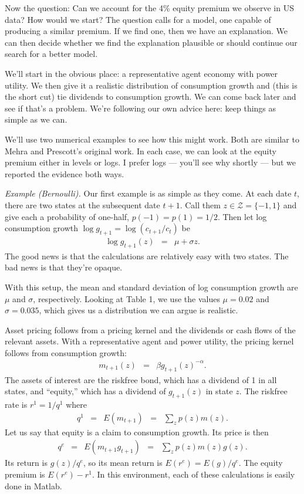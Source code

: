 \documentclass[11pt]{article}
\begin{document}
Now the question:  Can we account for the 4\% equity premium we observe in US data?
How would we start?
The question calls for a model, one capable of producing a similar premium.
If we find one, then we have an explanation.
We can then decide whether we find the explanation plausible
or should continue our search for a better model.

We'll start in the obvious place: a representative agent economy
with power utility.
We then give it a realistic distribution of consumption growth
and (this is the short cut) tie dividends to consumption growth.
We can come back later and see if that's a problem.
We're following our own advice here:
keep things as simple as we can.

We'll use two numerical examples to see how this might work.
Both are similar to Mehra and Prescott's original work.
In each case, we can look at the equity premium either in levels or logs.
I prefer logs --- you'll see why shortly --- but we reported the evidence both ways.

{\it Example (Bernoulli).}
Our first example is as simple as they come.
At each date $t$, there are two states at the subsequent date $t+1$.
Call them $ z \in \mathcal{Z} = \{-1, 1\}$ and give each
a probability of one-half, $p(-1) = p(1) = 1/2$.
Then let  log consumption growth $\log g_{t+1} = \log (c_{t+1}/c_t)$ be
\begin{eqnarray*}
    \log g_{t+1}(z) &=& \mu + \sigma z .
\end{eqnarray*}
The good news is that the calculations are relatively easy with two states.
The bad news is that they're opaque.

With this setup, the mean and standard deviation of log consumption growth
are $\mu$ and $\sigma$, respectively.
Looking at Table 1, we use the values $\mu = 0.02$ and $\sigma = 0.035$,
which gives us a distribution we can argue is realistic.

Asset pricing follows from a pricing kernel and the dividends or cash flows
of the relevant assets.
With a representative agent and power utility, the pricing kernel follows
from consumption growth:
\begin{eqnarray*}
    m_{t+1} (z) &=& \beta g_{t+1}(z)^{-\alpha} .
\end{eqnarray*}
The assets of interest are the riskfree bond, which has a dividend of 1 in all states,
and ``equity,'' which has a dividend of $g_{t+1}(z)$ in state $z$.
The riskfree rate is $r^1 = 1/q^1$ where
\begin{eqnarray*}
    q^1 &=& E (m_{t+1} )  \;\;=\;\; \sum_z p(z) m(z) .
\end{eqnarray*}
Let us say that equity is a claim to consumption growth.
Its price is then
\begin{eqnarray*}
    q^e &=& E (m_{t+1} g_{t+1} )  \;\;=\;\; \sum_z p(z) m(z) g(z) .
\end{eqnarray*}
Its return is $ g(z)/q^e$, so its mean return is $E(r^e) = E (g)/q^e$.
The equity premium is $ E(r^e) - r^1$.
In this environment, each of these calculations is easily done in Matlab.
\end{document}
